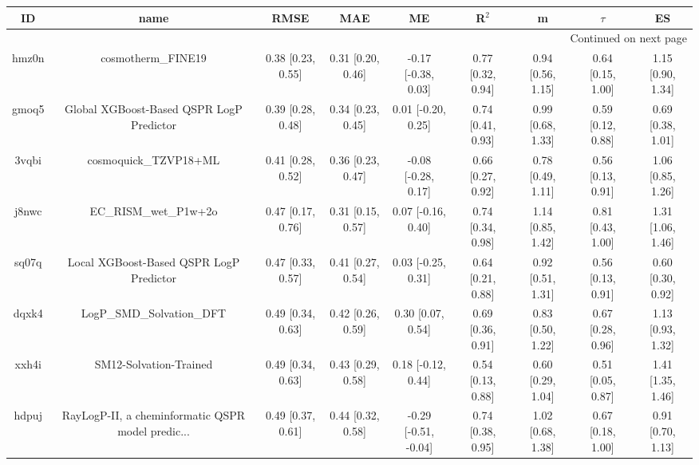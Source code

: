 \documentclass{article}
\begin{document}
\begin{center}
\scriptsize
\begin{longtable}{|ccccccccc|}
\toprule
    ID &                                               name &               RMSE &                MAE &                    ME &              R$^2$ &                    m &               $\tau$ &                    ES \\
\midrule
\endhead
\midrule
\multicolumn{9}{r}{{Continued on next page}} \\
\midrule
\endfoot

\bottomrule
\endlastfoot
 hmz0n &                                 cosmotherm\_FINE19 &  0.38 [0.23, 0.55] &  0.31 [0.20, 0.46] &   -0.17 [-0.38, 0.03] &  0.77 [0.32, 0.94] &    0.94 [0.56, 1.15] &    0.64 [0.15, 1.00] &     1.15 [0.90, 1.34] \\
 gmoq5 &           Global XGBoost-Based QSPR LogP Predictor &  0.39 [0.28, 0.48] &  0.34 [0.23, 0.45] &    0.01 [-0.20, 0.25] &  0.74 [0.41, 0.93] &    0.99 [0.68, 1.33] &    0.59 [0.12, 0.88] &     0.69 [0.38, 1.01] \\
 3vqbi &                              cosmoquick\_TZVP18+ML &  0.41 [0.28, 0.52] &  0.36 [0.23, 0.47] &   -0.08 [-0.28, 0.17] &  0.66 [0.27, 0.92] &    0.78 [0.49, 1.11] &    0.56 [0.13, 0.91] &     1.06 [0.85, 1.26] \\
 j8nwc &                              EC\_RISM\_wet\_P1w+2o &  0.47 [0.17, 0.76] &  0.31 [0.15, 0.57] &    0.07 [-0.16, 0.40] &  0.74 [0.34, 0.98] &    1.14 [0.85, 1.42] &    0.81 [0.43, 1.00] &     1.31 [1.06, 1.46] \\
 sq07q &            Local XGBoost-Based QSPR LogP Predictor &  0.47 [0.33, 0.57] &  0.41 [0.27, 0.54] &    0.03 [-0.25, 0.31] &  0.64 [0.21, 0.88] &    0.92 [0.51, 1.31] &    0.56 [0.13, 0.91] &     0.60 [0.30, 0.92] \\
 dqxk4 &                          LogP\_SMD\_Solvation\_DFT &  0.49 [0.34, 0.63] &  0.42 [0.26, 0.59] &     0.30 [0.07, 0.54] &  0.69 [0.36, 0.91] &    0.83 [0.50, 1.22] &    0.67 [0.28, 0.96] &     1.13 [0.93, 1.32] \\
 xxh4i &                             SM12-Solvation-Trained &  0.49 [0.34, 0.63] &  0.43 [0.29, 0.58] &    0.18 [-0.12, 0.44] &  0.54 [0.13, 0.88] &    0.60 [0.29, 1.04] &    0.51 [0.05, 0.87] &     1.41 [1.35, 1.46] \\
 hdpuj &  RayLogP-II, a cheminformatic QSPR model predic... &  0.49 [0.37, 0.61] &  0.44 [0.32, 0.58] &  -0.29 [-0.51, -0.04] &  0.74 [0.38, 0.95] &    1.02 [0.68, 1.38] &    0.67 [0.18, 1.00] &     0.91 [0.70, 1.13] \\

\end{longtable}
\end{center}
\end{document}
